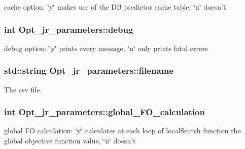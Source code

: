 cache option\-: \char`\"{}y\char`\"{} makes use of the D\-B predictor cache table; \char`\"{}n\char`\"{} doesn't 

\hypertarget{classOpt__jr__parameters_ae8241c7d0f75864365575e4be23037a3}{
\subsubsection[{debug}]{\setlength{\rightskip}{0pt plus 5cm}int Opt\-\_\-jr\-\_\-parameters\-::debug\hspace{0.3cm}{\ttfamily [private]}}}\label{classOpt__jr__parameters_ae8241c7d0f75864365575e4be23037a3}


debug option\-: \char`\"{}y\char`\"{} prints every message, \char`\"{}n\char`\"{} only prints fatal errors 

\hypertarget{classOpt__jr__parameters_aae2da456acbf5ac035faec6e01015714}{
\subsubsection[{filename}]{\setlength{\rightskip}{0pt plus 5cm}std\-::string Opt\-\_\-jr\-\_\-parameters\-::filename\hspace{0.3cm}{\ttfamily [private]}}}\label{classOpt__jr__parameters_aae2da456acbf5ac035faec6e01015714}


The csv file. 

\hypertarget{classOpt__jr__parameters_adf939a159428f604a0d524bee1234bf2}{
\subsubsection[{global\-\_\-\-F\-O\-\_\-calculation}]{\setlength{\rightskip}{0pt plus 5cm}int Opt\-\_\-jr\-\_\-parameters\-::global\-\_\-\-F\-O\-\_\-calculation\hspace{0.3cm}{\ttfamily [private]}}}\label{classOpt__jr__parameters_adf939a159428f604a0d524bee1234bf2}


global F\-O calculation\-: \char`\"{}y\char`\"{} calculates at each loop of local\-Search function the global objective function value, \char`\"{}n\char`\"{} doesn't 

